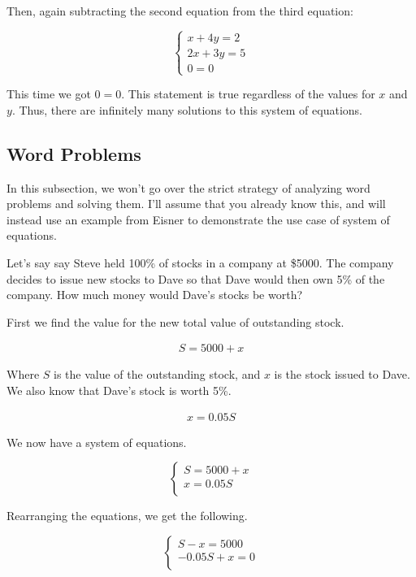 \documentclass{scrbook}
\theoremstyle{definition}
\begin{document}
Then, again subtracting the second equation from the third equation: 

\[
  \begin{cases}
    x + 4y = 2\\
    2x + 3y = 5\\
    0 = 0
  \end{cases}
\]

This time we got $0=0$. This statement is true regardless of the values for $x$ and $y$. Thus, there are infinitely many solutions to this system of equations. 

\subsection{Word Problems}

In this subsection, we won't go over the strict strategy of analyzing word problems and solving them. I'll assume that you already know this, and will instead use an example from Eisner \cite{eisner:1994} to demonstrate the use case of system of equations.

Let's say say Steve held 100\% of stocks in a company at \$5000. The company decides to issue new stocks to Dave so that Dave would then own 5\% of the company. How much money would Dave's stocks be worth?

First we find the value for the new total value of outstanding stock.

\begin{align*}
  S = 5000 + x
\end{align*}

Where $S$ is the value of the outstanding stock, and $x$ is the stock issued to Dave. We also know that Dave's stock is worth 5\%. 

\begin{align*}
  x = 0.05S
\end{align*}

We now have a system of equations.

\[
  \begin{cases}
    S = 5000 + x\\
    x = 0.05S\\
  \end{cases}
\]

Rearranging the equations, we get the following.

\[
  \begin{cases}
    S - x = 5000\\
    -0.05S + x = 0\\
  \end{cases}
\]
\end{document}
